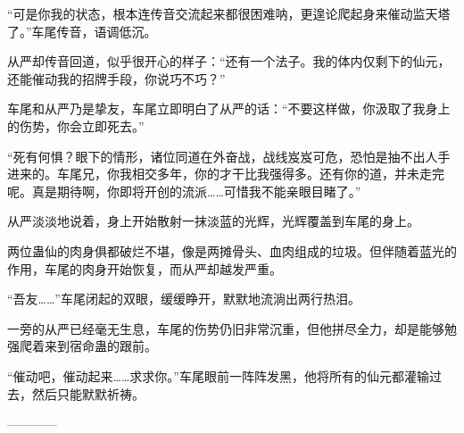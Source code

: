\begin{this_body}
“可是你我的状态，根本连传音交流起来都很困难呐，更遑论爬起身来催动监天塔了。”车尾传音，语调低沉。

从严却传音回道，似乎很开心的样子：“还有一个法子。我的体内仅剩下的仙元，还能催动我的招牌手段，你说巧不巧？”

车尾和从严乃是挚友，车尾立即明白了从严的话：“不要这样做，你汲取了我身上的伤势，你会立即死去。”

“死有何惧？眼下的情形，诸位同道在外奋战，战线岌岌可危，恐怕是抽不出人手进来的。车尾兄，你我相交多年，你的才干比我强得多。还有你的道，并未走完呢。真是期待啊，你即将开创的流派……可惜我不能亲眼目睹了。”

从严淡淡地说着，身上开始散射一抹淡蓝的光辉，光辉覆盖到车尾的身上。

两位蛊仙的肉身俱都破烂不堪，像是两摊骨头、血肉组成的垃圾。但伴随着蓝光的作用，车尾的肉身开始恢复，而从严却越发严重。

“吾友……”车尾闭起的双眼，缓缓睁开，默默地流淌出两行热泪。

一旁的从严已经毫无生息，车尾的伤势仍旧非常沉重，但他拼尽全力，却是能够勉强爬着来到宿命蛊的跟前。

“催动吧，催动起来……求求你。”车尾眼前一阵阵发黑，他将所有的仙元都灌输过去，然后只能默默祈祷。

------------

\end{this_body}

